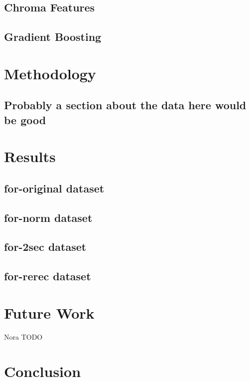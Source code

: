 \documentclass[sigconf,authordraft]{acmart}
\begin{document}
\subsection{Chroma Features}

\subsection{Gradient Boosting}

\section{Methodology}

\subsection{Probably a section about the data here would be good}

\section{Results}

\subsection{for-original dataset}

\subsection{for-norm dataset}

\subsection{for-2sec dataset}

\subsection{for-rerec dataset}

\section{Future Work}
Nora TODO
\section{Conclusion}

\begin{acks}

\end{acks}



\end{document}
